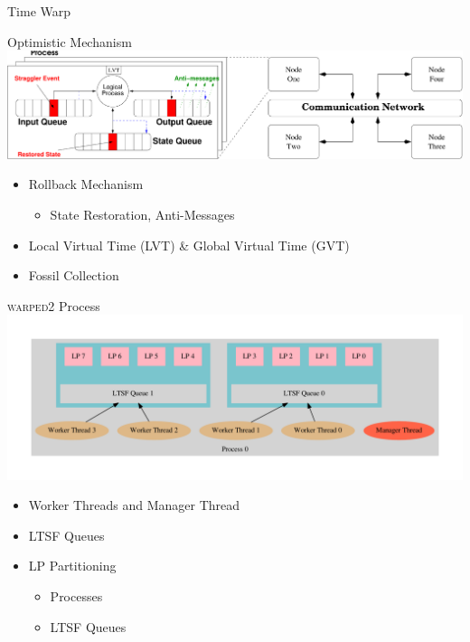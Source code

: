 \documentclass[10pt]{beamer}
\begin{document}
\begin{frame}{Time Warp}
    \begin{block}{Optimistic Mechanism}
        \bigskip
        \includegraphics[width=\textwidth]{../figs/timeWarp.pdf}
        \bigskip
        \begin{itemize}
            \item Rollback Mechanism
                \begin{itemize}
                    \item State Restoration, Anti-Messages
                \end{itemize}
            \item Local Virtual Time (LVT) \& Global Virtual Time (GVT)
            \item Fossil Collection
        \end{itemize}
    \end{block}
\end{frame}

\begin{frame}{\textsc{warped2} Process}
        \includegraphics[width=\textwidth]{../figs/graphviz/partitioning.pdf}
        \begin{itemize}
            \item Worker Threads and Manager Thread
            \item LTSF Queues
            \item LP Partitioning
            \begin{itemize}
                \item Processes
                \item LTSF Queues
            \end{itemize}
        \end{itemize}
\end{frame}
\end{document}
